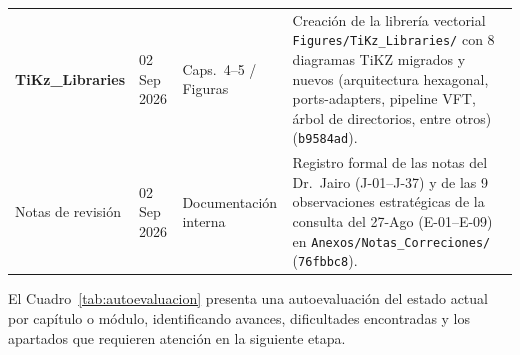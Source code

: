 \begin{longtable}{>{\bfseries}p{2.4cm} p{2.0cm} p{3.3cm} p{5.8cm}}
    TiKz\_Libraries
    & 02 Sep 2026
    & Caps.\ 4--5 / Figuras
    & Creación de la librería vectorial \texttt{Figures/TiKz\_Libraries/} con 8 diagramas TiKZ migrados y nuevos (arquitectura hexagonal, ports-adapters, pipeline VFT, árbol de directorios, entre otros) (\texttt{b9584ad}). \\
    \addlinespace[3pt]

    Notas de revisión
    & 02 Sep 2026
    & Documentación interna
    & Registro formal de las notas del Dr.\ Jairo (J-01–J-37) y de las 9 observaciones estratégicas de la consulta del 27-Ago (E-01–E-09) en \texttt{Anexos/Notas\_Correciones/} (\texttt{76fbbc8}). \\

\end{longtable}

\vspace{1em}

El Cuadro~\ref{tab:autoevaluacion} presenta una autoevaluación del estado actual
por capítulo o módulo, identificando avances, dificultades encontradas y
los apartados que requieren atención en la siguiente etapa.

